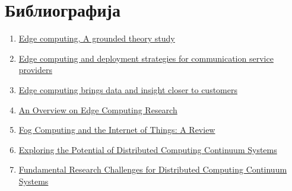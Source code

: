 \section{Библиографија}

\begin{enumerate}
    \item \href{https://link.springer.com/article/10.1007/s00607-022-01104-2}{Edge computing, A grounded theory study}
    \item \href{https://www.ericsson.com/en/reports-and-papers/white-papers/edge-computing-and-deployment-strategies-for-communication-service-providers}{Edge computing and deployment strategies for communication service providers}
    \item \href{https://www.redhat.com/en/resources/bring-insight-data-customer-edge-computing-whitepaper}{Edge computing brings data and insight closer to customers}
     \item \href{https://www.researchgate.net/publication/341096184_An_Overview_on_Edge_Computing_Research}{An Overview on Edge Computing Research}
    \item \href{https://www.mdpi.com/2504-2289/2/2/10}{Fog Computing and the Internet of Things: A Review }
    \item \href{https://www.mdpi.com/2073-431X/12/10/198}{Exploring the Potential of Distributed Computing
Continuum Systems}
    \item \href{https://www.mdpi.com/2078-2489/14/3/198}{Fundamental Research Challenges for Distributed Computing
Continuum Systems}
\end{enumerate}